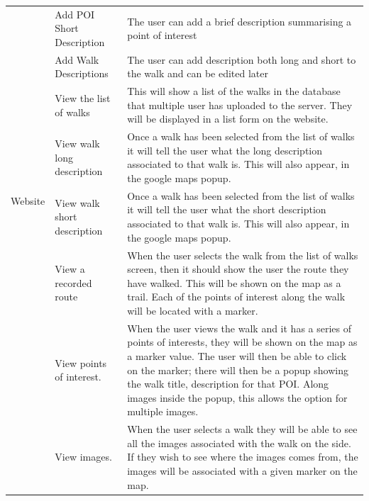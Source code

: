 \documentclass[12pt]{article}
\begin{document}
\begin{longtable}{|p{2cm}|p{3cm}|p{10cm}|}
\\\cline{2-3} & \multicolumn{1}{|p{3cm}|}{Add POI Short Description} & \multicolumn{1}{|p{10cm}|}{The user can add a brief description summarising a point of interest}
\\\cline{2-3} & \multicolumn{1}{|p{3cm}|}{Add Walk Descriptions} & \multicolumn{1}{|p{10cm}|}{The user can add description both long and short to the walk and can be edited later}
\\\hline
 \multirow{4}{*}{Website} & \multicolumn{1}{|p{3cm}|}{View the list of walks} & \multicolumn{1}{|p{10cm}|}{This will show a list of the walks in the database that multiple user has uploaded to the server. They will be displayed in a list form on the website.} \\\cline{2-3} & \multicolumn{1}{|p{3cm}|}{View walk long description}& \multicolumn{1}{|p{10cm}|}{Once a walk has been selected from the list of walks it will tell the user what the long description associated to that walk is. This will also appear, in the google maps popup.}
\\\cline{2-3} & \multicolumn{1}{|p{3cm}|}{View walk short description}& \multicolumn{1}{|p{10cm}|}{Once a walk has been selected from the list of walks it will tell the user what the short description associated to that walk is. This will also appear, in the google maps popup.}
\\\cline{2-3} & \multicolumn{1}{|p{3cm}|}{View a recorded route}& \multicolumn{1}{|p{10cm}|}{When the user selects the walk from the list of walks screen, then it should show the user the route they have walked. This will be shown on the map as a trail. Each of the points of interest along the walk will be located with a marker.}
\\\cline{2-3} & \multicolumn{1}{|p{3cm}|}{View points of interest.}& \multicolumn{1}{|p{10cm}|}{When the user views the walk and it has a series of points of interests, they will be shown on the map as a marker value. The user will then be able to click on the marker; there will then be a popup showing the walk title, description for that POI. Along images inside the popup, this allows the option for multiple images.}
\\\cline{2-3} & \multicolumn{1}{|p{3cm}|}{View images.}& \multicolumn{1}{|p{10cm}|}{When the user selects a walk they will be able to see all the images associated with the walk on the side. If they wish to see where the images comes from, the images will be associated with a given marker on the map.}
\\\hline
\end{longtable}
\newpage
\end{document}
